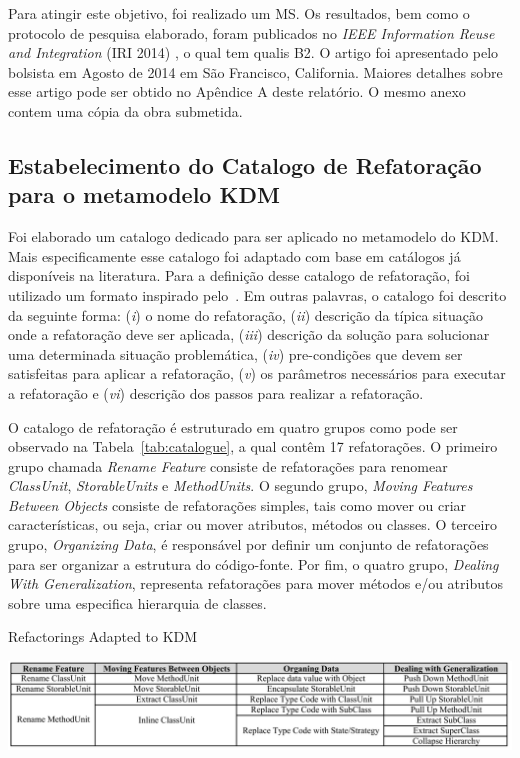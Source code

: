 Para atingir este objetivo, foi realizado um MS. Os resultados, bem como o protocolo de pesquisa elaborado, foram publicados no \textit{IEEE Information Reuse and Integration} (IRI 2014) , o qual tem qualis B2. O artigo foi apresentado pelo bolsista em Agosto de 2014 em São Francisco, California. Maiores detalhes sobre esse artigo pode ser obtido no Apêndice A deste relatório. O mesmo anexo contem uma cópia da obra submetida.


\subsection{Estabelecimento do Catalogo de Refatoração para o metamodelo KDM} %
	 \label{sub:catalogo_kdm}

Foi elaborado um catalogo dedicado para ser aplicado no metamodelo do KDM. Mais especificamente esse catalogo foi adaptado com base em catálogos já disponíveis na literatura. Para a definição desse catalogo de refatoração, foi utilizado um formato inspirado pelo~\cite{refactImpro}. Em outras palavras, o catalogo foi descrito da seguinte forma: (\textit{i}) o nome do refatoração, (\textit{ii}) descrição da típica situação onde a refatoração deve ser aplicada, (\textit{iii}) descrição da solução para solucionar uma determinada situação problemática, (\textit{iv}) pre-condições que devem ser satisfeitas para aplicar a refatoração, (\textit{v}) os parâmetros necessários para executar a refatoração e (\textit{vi}) descrição dos passos para realizar a refatoração.

O catalogo de refatoração é estruturado em quatro grupos como pode ser observado na Tabela~\ref{tab:catalogue}, a qual contêm 17 refatorações. O primeiro grupo chamada \textit{Rename Feature} consiste de refatorações para renomear \textit{ClassUnit}, \textit{StorableUnits} e \textit{MethodUnits}. O segundo grupo, \textit{Moving Features Between Objects} consiste de refatorações simples, tais como mover ou criar características, ou seja, criar ou mover atributos, métodos ou classes. O terceiro grupo,  \textit{Organizing Data}, é responsável por definir um conjunto de refatorações para ser organizar a estrutura do código-fonte. Por fim, o quatro grupo, \textit{Dealing With Generalization}, representa refatorações para mover métodos e/ou atributos sobre uma especifica hierarquia de classes. 

\begin{table}[!h]
\caption{Refactorings Adapted to KDM}
\label{tab:adaptedRefactoring}
\centering
  \includegraphics[scale=0.67]{figuras/NovoCatalogue}
\end{table}

